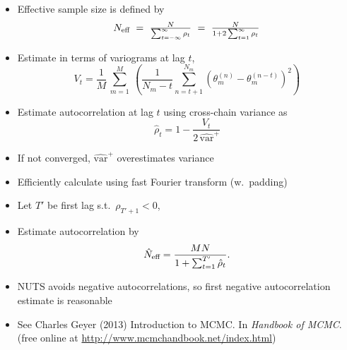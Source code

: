 \documentclass[10pt]{report}
\begin{document}
%
\begin{itemize}
\item Effective sample size is defined by
\[\textstyle
N_{\mbox{\scriptsize eff}}
\ = \
\frac{N}{\sum_{t = -\infty}^{\infty} \rho_t}
\ = \
\frac{N}{1 + 2 \sum_{t = 1}^{\infty} \rho_t}
\]
\item Estimate in terms of variograms at lag $t$,
\[\textstyle
V_t = 
\frac{1}{M}
\,
\sum_{m=1}^M 
\
\left(
\frac{1}{N_m - t}
\sum_{n=t+1}^{N_m}
\left(
\theta_m^{(n)} - \theta_m^{(n-t)}
\right)^2
\right)
\]
\item Estimate autocorrelation at lag $t$ using cross-chain variance
  as
\[
\hat{\rho}_t
= 1 - \frac{\displaystyle V_t}{
            \displaystyle 2 \, \widehat{\mbox{var}}^{+}}
\]
\item If not converged, $\widehat{\mbox{var}}^{+}$ overestimates variance
\item Efficiently calculate using fast Fourier transform (w.\ padding)
\end{itemize}


%
\begin{itemize}
\item Let $T'$ be first lag s.t.\ $\rho_{T' + 1} < 0$, 
\item Estimate autocorrelation by
\[
\hat{N}_{\mbox{\scriptsize eff}}
= 
\frac{MN}
     {1 + \sum_{t=1}^{T'} \hat{\rho}_t}.
\]
\item NUTS avoids negative autocorrelations, so first negative
  autocorrelation estimate is reasonable
\vfill
\item See {\footnotesize Charles Geyer (2013) Introduction to MCMC. In
    {\slshape Handbook of MCMC}.
 (free online at \url{http://www.mcmchandbook.net/index.html})}
\end{itemize}
\end{document}
